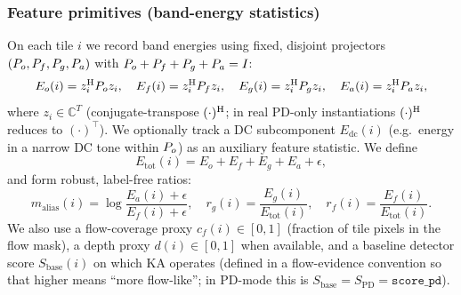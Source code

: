 \subsubsection{Feature primitives (band-energy statistics)}
On each tile $i$ we record band energies using fixed, disjoint projectors $(P_o,P_f,P_g,P_a)$ with $P_o+P_f+P_g+P_a=I$:
\[
E_o(i)=z_i^{\mathrm{H}} P_o z_i,\quad E_f(i)=z_i^{\mathrm{H}} P_f z_i,\quad E_g(i)=z_i^{\mathrm{H}} P_g z_i,\quad E_a(i)=z_i^{\mathrm{H}} P_a z_i,
\]
where $z_i\in\mathbb{C}^T$ (conjugate-transpose $(\cdot)^{\mathrm{H}}$; in real PD-only instantiations $(\cdot)^{\mathrm{H}}$ reduces to $(\cdot)^\top$). We optionally track a DC subcomponent $E_{\mathrm{dc}}(i)$ (e.g.\ energy in a narrow DC tone within $P_o$) as an auxiliary feature statistic. We define
\[
E_{\mathrm{tot}}(i)=E_o+E_f+E_g+E_a+\epsilon,
\]
and form robust, label-free ratios:
\[
m_{\mathrm{alias}}(i)=\log\frac{E_a(i)+\epsilon}{E_f(i)+\epsilon},\quad
r_g(i)=\frac{E_g(i)}{E_{\mathrm{tot}}(i)},\quad
r_f(i)=\frac{E_f(i)}{E_{\mathrm{tot}}(i)}.
\]
We also use a flow-coverage proxy $c_f(i)\in[0,1]$ (fraction of tile pixels in the flow mask), a depth proxy $d(i)\in[0,1]$ when available, and a baseline detector score $S_{\mathrm{base}}(i)$ on which KA operates (defined in a flow-evidence convention so that higher means ``more flow-like''; in PD-mode this is $S_{\mathrm{base}}=S_{\mathrm{PD}}=\texttt{score\_pd}$).

